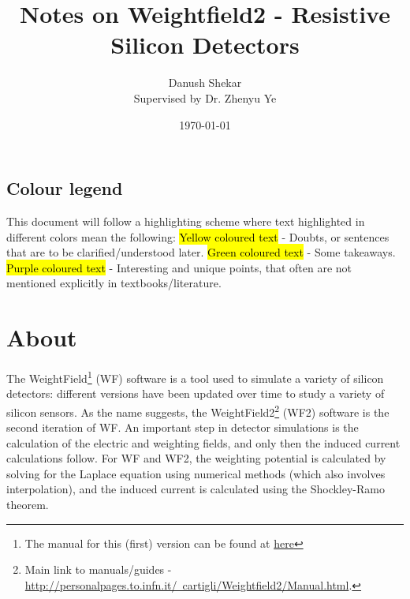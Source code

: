 \documentclass[11pt]{article}
\title{Notes on Weightfield2 - Resistive Silicon Detectors}
\author{Danush Shekar\\ Supervised by Dr. Zhenyu Ye}
\date{\today}
\newcommand{\hlyellow}[1]{{\sethlcolor{yellow}\hl{#1}}}
\newcommand{\hlgreen}[1]{{\sethlcolor{green2}\hl{#1}}}
\newcommand{\hlred}[1]{{\sethlcolor{red2}\hl{#1}}}
\newcommand{\hlpurple}[1]{{\sethlcolor{purple2}\hl{#1}}}
\begin{document}
\maketitle
\tableofcontents

\newpage


\subsection*{Colour legend}
This document will follow a highlighting scheme where text highlighted in different colors mean the following:
\newline
\hlyellow{Yellow coloured text} - Doubts, or sentences that are to be clarified/understood later.\newline
\hlgreen{Green coloured text} - Some takeaways.\newline
\hlpurple{Purple coloured text} - Interesting and unique points, that often are not mentioned explicitly in textbooks/literature.

\section{About}
The WeightField\footnote{The manual for this (first) version can be found at \href{http://personalpages.to.infn.it/~cartigli/Weightfield2/Manual_files/Manual_Weightfield.pdf}{here}} (WF) software is a tool used to simulate a variety of silicon detectors: different versions have been updated over time to study a variety of silicon sensors. As the name suggests, the WeightField2\footnote{Main link to manuals/guides - \href{http://personalpages.to.infn.it/~cartigli/Weightfield2/Manual.html}{http://personalpages.to.infn.it/~cartigli/Weightfield2/Manual.html}.} (WF2) software is the second iteration of WF. An important step in detector simulations is the calculation of the electric and weighting fields, and only then the induced current calculations follow. For WF and WF2, the weighting potential is calculated by solving for the Laplace equation using numerical methods (which also involves interpolation), and the induced current is calculated using the Shockley-Ramo theorem. %
\end{document}

